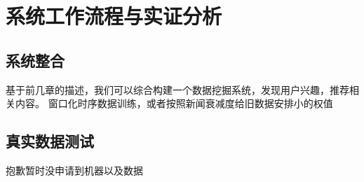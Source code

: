 \chapter{系统工作流程与实证分析}
\section{系统整合}
基于前几章的描述，我们可以综合构建一个数据挖掘系统，发现用户兴趣，推荐相关内容。
窗口化时序数据训练，或者按照新闻衰减度给旧数据安排小的权值
\section{真实数据测试}
抱歉暂时没申请到机器以及数据